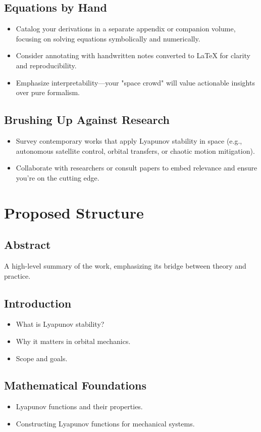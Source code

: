 \documentclass[11pt]{article}
\begin{document}
\subsection{Equations by Hand}
\begin{itemize}
    \item Catalog your derivations in a separate appendix or companion volume, focusing on solving equations symbolically and numerically.
    \item Consider annotating with handwritten notes converted to LaTeX for clarity and reproducibility.
    \item Emphasize interpretability—your "space crowd" will value actionable insights over pure formalism.
\end{itemize}

\subsection{Brushing Up Against Research}
\begin{itemize}
    \item Survey contemporary works that apply Lyapunov stability in space (e.g., autonomous satellite control, orbital transfers, or chaotic motion mitigation).
    \item Collaborate with researchers or consult papers to embed relevance and ensure you're on the cutting edge.
\end{itemize}

\section{Proposed Structure}
\subsection{Abstract}
A high-level summary of the work, emphasizing its bridge between theory and practice.

\subsection{Introduction}
\begin{itemize}
    \item What is Lyapunov stability?
    \item Why it matters in orbital mechanics.
    \item Scope and goals.
\end{itemize}

\subsection{Mathematical Foundations}
\begin{itemize}
    \item Lyapunov functions and their properties.
    \item Constructing Lyapunov functions for mechanical systems.
\end{itemize}
\end{document}
